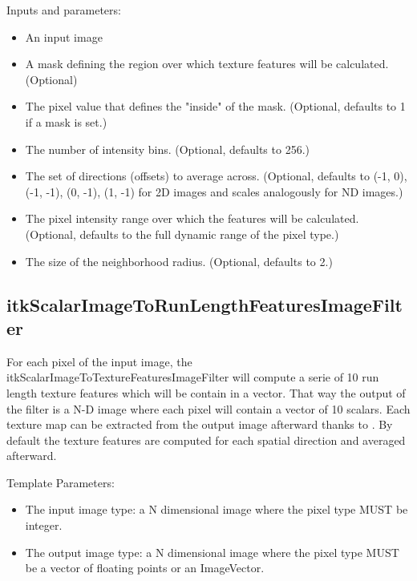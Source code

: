 \documentclass{InsightArticle}
\begin{document}
Inputs and parameters:
\begin{itemize}
 \item An input image
 \item A mask defining the region over which texture features will be calculated. (Optional)
 \item The pixel value that defines the "inside" of the mask. (Optional, defaults to 1 if a mask is set.)
 \item The number of intensity bins. (Optional, defaults to 256.)
 \item The set of directions (offsets) to average across. (Optional, defaults to {(-1, 0), (-1, -1), (0, -1), (1, -1)} for 2D images and scales analogously for ND images.)
 \item The pixel intensity range over which the features will be calculated. (Optional, defaults to the full dynamic range of the pixel type.)
 \item The size of the neighborhood radius. (Optional, defaults to 2.)
\end{itemize}

\subsection{itkScalarImageToRunLengthFeaturesImageFilter}
\label{sec:RLFilter}

For each pixel of the input image, the itkScalarImageToTextureFeaturesImageFilter will compute a serie of 10 run length texture features which will be contain in a vector. That way the output of the filter is a N-D image where each pixel will contain a vector of 10 scalars. Each texture map can be extracted from the output image afterward thanks to . By default the texture features are computed for each spatial direction and averaged afterward.

Template Parameters:
\begin{itemize}
 \item The input image type: a N dimensional image where the pixel type MUST be integer.
 \item The output image type: a N dimensional image where the pixel type MUST be a vector of floating points or an ImageVector.
\end{itemize}
\end{document}
